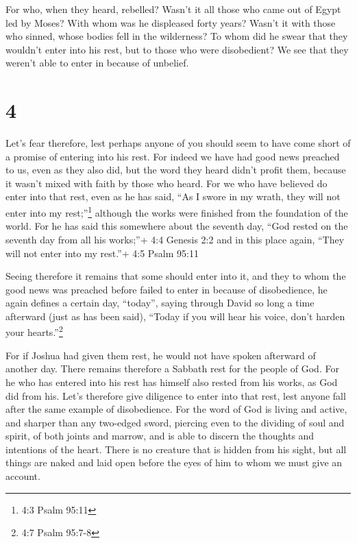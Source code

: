  For who, when they heard, rebelled? Wasn't it all those
who came out of Egypt led by Moses?  With whom was he
displeased forty years? Wasn't it with those who sinned, whose bodies
fell in the wilderness?  To whom did he swear that they
wouldn't enter into his rest, but to those who were disobedient?
 We see that they weren't able to enter in because of
unbelief.

\hypertarget{section-3}{%
\section{4}\label{section-3}}

 Let's fear therefore, lest perhaps anyone of you should
seem to have come short of a promise of entering into his rest.
 For indeed we have had good news preached to us, even as
they also did, but the word they heard didn't profit them, because it
wasn't mixed with faith by those who heard.  For we who have
believed do enter into that rest, even as he has said, ``As I swore in
my wrath, they will not enter into my rest;''\footnote{4:3 Psalm 95:11}
although the works were finished from the foundation of the world.
 For he has said this somewhere about the seventh day, ``God
rested on the seventh day from all his works;''+ 4:4 Genesis 2:2
 and in this place again, ``They will not enter into my
rest.''+ 4:5 Psalm 95:11

 Seeing therefore it remains that some should enter into it,
and they to whom the good news was preached before failed to enter in
because of disobedience,  he again defines a certain day,
``today'', saying through David so long a time afterward (just as has
been said), ``Today if you will hear his voice, don't harden your
hearts.''\footnote{4:7 Psalm 95:7-8}

 For if Joshua had given them rest, he would not have spoken
afterward of another day.  There remains therefore a Sabbath
rest for the people of God.  For he who has entered into
his rest has himself also rested from his works, as God did from his.
 Let's therefore give diligence to enter into that rest,
lest anyone fall after the same example of disobedience. 
For the word of God is living and active, and sharper than any two-edged
sword, piercing even to the dividing of soul and spirit, of both joints
and marrow, and is able to discern the thoughts and intentions of the
heart.  There is no creature that is hidden from his sight,
but all things are naked and laid open before the eyes of him to whom we
must give an account.

